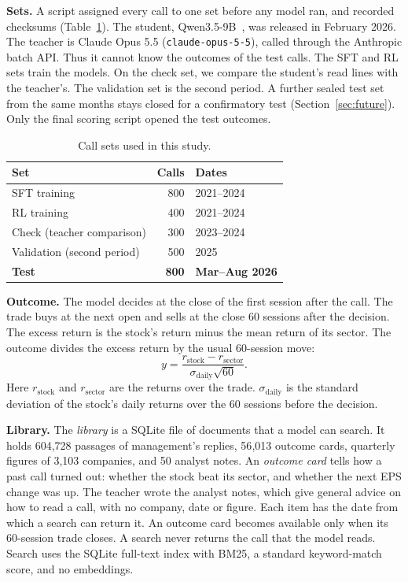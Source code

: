 \documentclass[sigconf,nonacm]{acmart}
\begin{document}
\textbf{Sets.} A script assigned every call to one set before any model ran, and recorded checksums (Table~\ref{tab:sets}).
The student, Qwen3.5-9B~\cite{qwen2026qwen35}, was released in February 2026.
The teacher is Claude Opus 5.5 (\texttt{claude-opus-5-5}), called through the Anthropic batch API.
Thus it cannot know the outcomes of the test calls.
The SFT and RL sets train the models.
On the check set, we compare the student's read lines with the teacher's.
The validation set is the second period.
A further sealed test set from the same months stays closed for a confirmatory test (Section~\ref{sec:future}).
Only the final scoring script opened the test outcomes.

\begin{table}[t]
\caption{Call sets used in this study.}
\label{tab:sets}
\small
\begin{tabular}{lrl}
\toprule
Set & Calls & Dates \\
\midrule
SFT training & 800 & 2021--2024 \\
RL training & 400 & 2021--2024 \\
Check (teacher comparison) & 300 & 2023--2024 \\
Validation (second period) & 500 & 2025 \\
\textbf{Test} & \textbf{800} & \textbf{Mar--Aug 2026} \\
\bottomrule
\end{tabular}
\end{table}

\textbf{Outcome.} The model decides at the close of the first session after the call.
The trade buys at the next open and sells at the close 60 sessions after the decision.
The excess return is the stock's return minus the mean return of its sector.
The outcome divides the excess return by the usual 60-session move:
\begin{equation}
y = \frac{r_{\text{stock}} - r_{\text{sector}}}{\sigma_{\text{daily}}\sqrt{60}} .\label{eq:y}
\end{equation}
Here $r_{\text{stock}}$ and $r_{\text{sector}}$ are the returns over the trade.
$\sigma_{\text{daily}}$ is the standard deviation of the stock's daily returns over the 60 sessions before the decision.

\textbf{Library.} The \emph{library} is a SQLite file of documents that a model can search.
It holds 604{,}728 passages of management's replies, 56{,}013 outcome cards, quarterly figures of 3{,}103 companies, and 50 analyst notes.
An \emph{outcome card} tells how a past call turned out: whether the stock beat its sector, and whether the next EPS change was up.
The teacher wrote the analyst notes, which give general advice on how to read a call, with no company, date or figure.
Each item has the date from which a search can return it.
An outcome card becomes available only when its 60-session trade closes.
A search never returns the call that the model reads.
Search uses the SQLite full-text index with BM25, a standard keyword-match score, and no embeddings.
\end{document}
